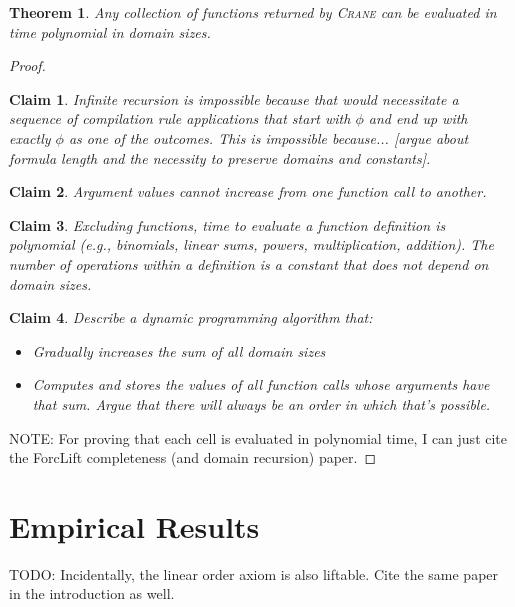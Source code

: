 \documentclass{article}
\newtheorem{theorem}{Theorem}
\newtheorem{claim}{Claim}
\theoremstyle{definition}
\begin{document}
\begin{theorem}
  Any collection of functions returned by \textsc{Crane} can be evaluated in
  time polynomial in domain sizes.
\end{theorem}
\begin{proof}
  \begin{claim}
    Infinite recursion is impossible because that would necessitate a sequence
    of compilation rule applications that start with $\phi$ and end up with
    exactly $\phi$ as one of the outcomes. This is impossible because... [argue
    about formula length and the necessity to preserve domains and constants].
  \end{claim}
  \begin{claim}
    Argument values cannot increase from one function call to another.
  \end{claim}
  \begin{claim}
    Excluding functions, time to evaluate a function definition is polynomial
    (e.g., binomials, linear sums, powers, multiplication, addition). The number
    of operations within a definition is a constant that does not depend on
    domain sizes.
  \end{claim}
  \begin{claim}
    Describe a dynamic programming algorithm that:
    \begin{itemize}
      \item Gradually increases the sum of all domain sizes
      \item Computes and stores the values of all function calls whose arguments
            have that sum. Argue that there will always be an order in which
            that's possible.
    \end{itemize}
  \end{claim}
  NOTE: For proving that each cell is evaluated in polynomial time, I can just
  cite the ForcLift completeness (and domain recursion) paper.
\end{proof}

\section{Empirical Results}\label{sec:results}

TODO: Incidentally, the linear order axiom is also liftable. Cite the same
paper~\cite{DBLP:journals/corr/abs-2211-01164} in the introduction as well.
\end{document}
